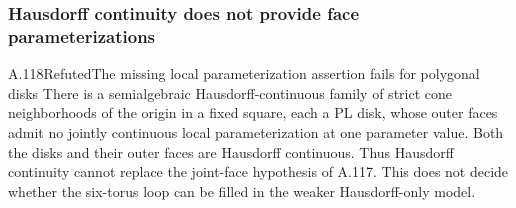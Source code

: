 \subsubsection{Hausdorff continuity does not provide face parameterizations}
\begin{saresult}{A.118}{Refuted}{The missing local parameterization assertion fails for polygonal disks}
There is a semialgebraic Hausdorff-continuous family of strict cone
neighborhoods of the origin in a fixed square, each a PL disk, whose
outer faces admit no jointly continuous local parameterization at one
parameter value. Both the disks and their outer faces are Hausdorff
continuous. Thus Hausdorff continuity cannot replace the joint-face
hypothesis of A.117. This does not decide whether the six-torus loop
can be filled in the weaker Hausdorff-only model.
\end{saresult}

